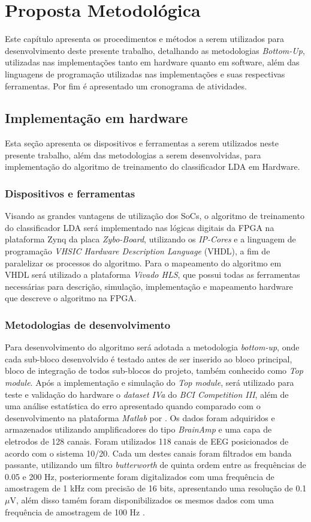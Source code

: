 \chapter[Proposta Metodológica]{Proposta Metodológica}
Este capítulo apresenta os procedimentos e métodos a serem utilizados para desenvolvimento deste presente trabalho, detalhando as metodologias \textit{Bottom-Up}, utilizadas nas implementações tanto em hardware quanto em software, além das linguagens de programação utilizadas nas implementações e suas respectivas ferramentas. Por fim é apresentado um cronograma de atividades.

\section{Implementação em hardware}
Esta seção apresenta os dispositivos e ferramentas a serem utilizados neste presente trabalho, além das metodologias a serem desenvolvidas, para implementação do algoritmo de treinamento do classificador LDA em Hardware.

\subsection{Dispositivos e ferramentas}
Visando as grandes vantagens de utilização dos SoCs, o algoritmo de treinamento do classificador LDA será implementado nas lógicas digitais da FPGA na plataforma Zynq da placa \textit{Zybo-Board}, utilizando os \textit{IP-Cores} e a linguagem de programação \textit{VHSIC Hardware Description Language} (VHDL), a fim de paralelizar os processos do algoritmo. Para o mapeamento do algoritmo em VHDL será utilizado a plataforma \textit{Vivado HLS}, que possui todas as ferramentas necessárias para descrição, simulação, implementação e mapeamento hardware que descreve o algoritmo na FPGA.

\subsection{Metodologias de desenvolvimento}
Para desenvolvimento do algoritmo será adotada a metodologia \textit{bottom-up}, onde cada sub-bloco desenvolvido é testado antes de ser inserido ao bloco principal, bloco de integração de todos sub-blocos do projeto, também conhecido como \textit{Top module}.
Após a implementação e simulação do \textit{Top module}, será utilizado para teste e validação do hardware o \textit{dataset IVa} do \textit{BCI Competition III}, além de uma análise estatística do erro apresentado quando comparado com o desenvolvimento na plataforma \textit{Matlab} por \cite{F.Lotte}.
Os dados foram adquiridos e armazenados utilizando amplificadores do tipo \textit{BrainAmp} e uma capa de eletrodos de 128 canais. Foram utilizados 118 canais de EEG posicionados de acordo com o sistema 10/20. Cada um destes canais foram filtrados em banda passante, utilizando um filtro \textit{butterworth} de quinta ordem entre as frequências de 0.05 e 200 Hz, posteriormente foram digitalizados com uma frequência de amostragem de 1 kHz com precisão de 16 bits, apresentando uma resolução de 0.1 $\mu$V, além disso tamém foram disponibilizados os mesmos dados com uma frequência de amostragem de 100 Hz \cite{siteBCI}.

